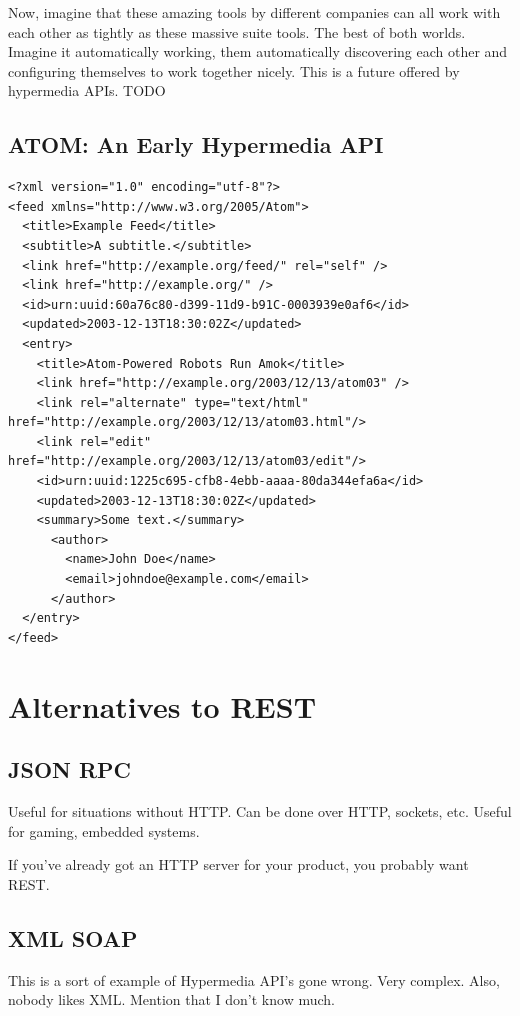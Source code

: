 \documentclass{book}
\begin{document}
Now, imagine that these amazing tools by different companies can all work with each other as tightly as these massive suite tools. The best of both worlds. Imagine it automatically working, them automatically discovering each other and configuring themselves to work together nicely. This is a future offered by hypermedia APIs. TODO

\section{ATOM: An Early Hypermedia API}

\begin{verbatim}
<?xml version="1.0" encoding="utf-8"?>
<feed xmlns="http://www.w3.org/2005/Atom">
  <title>Example Feed</title>
  <subtitle>A subtitle.</subtitle>
  <link href="http://example.org/feed/" rel="self" />
  <link href="http://example.org/" />
  <id>urn:uuid:60a76c80-d399-11d9-b91C-0003939e0af6</id>
  <updated>2003-12-13T18:30:02Z</updated>
  <entry>
    <title>Atom-Powered Robots Run Amok</title>
    <link href="http://example.org/2003/12/13/atom03" />
    <link rel="alternate" type="text/html" href="http://example.org/2003/12/13/atom03.html"/>
    <link rel="edit" href="http://example.org/2003/12/13/atom03/edit"/>
    <id>urn:uuid:1225c695-cfb8-4ebb-aaaa-80da344efa6a</id>
    <updated>2003-12-13T18:30:02Z</updated>
    <summary>Some text.</summary>
      <author>
        <name>John Doe</name>
        <email>johndoe@example.com</email>
      </author>
  </entry>
</feed>
\end{verbatim}


\chapter{Alternatives to REST}

\section{JSON RPC}

Useful for situations without HTTP. Can be done over HTTP, sockets, etc. Useful for gaming, embedded systems.

If you've already got an HTTP server for your product, you probably want REST.


\section{XML SOAP}

This is a sort of example of Hypermedia API's gone wrong. Very complex. Also, nobody likes XML. Mention that I don't know much.
\end{document}
